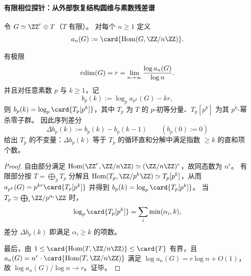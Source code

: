 \paragraph{有限相位探针：从外部恢复结构圆维与素数残差谱}
令 \(G\simeq \ZZ^r\oplus T\)（\(T\) 有限）。
对每个 \(n\ge 1\) 定义
\[
a_n(G):=\card{\operatorname{Hom}(G,\ZZ/n\ZZ)}.
\]

\begin{theorem}\label{thm:cdim-finite-probe-extraction}
有极限
\[
\operatorname{cdim}(G)=r=\lim_{n\to\infty}\frac{\log a_n(G)}{\log n}.
\]
并且对任意素数 \(p\) 与 \(k\ge 1\)，记
\[
b_{p}(k):=\log_p a_{p^k}(G)-kr,
\]
则 \(b_p(k)=\log_p\card{T_p[p^k]}\)，其中 \(T_p\) 为 \(T\) 的 \(p\)-初等分量、\(T_p[p^k]\) 为其 \(p^k\)-幂杀零子群。
因此序列差分
\[
\Delta b_p(k):=b_p(k)-b_p(k-1)\qquad(b_p(0):=0)
\]
给出 \(T_p\) 的不变量：\(\Delta b_p(k)\) 等于 \(T_p\) 的循环直和分解中满足指数 \(\ge k\) 的直和项个数。
\end{theorem}
\begin{proof}
自由部分满足 \(\operatorname{Hom}(\ZZ^r,\ZZ/n\ZZ)\simeq(\ZZ/n\ZZ)^r\)，故同态数为 \(n^r\)。
有限部分按 \(T=\bigoplus_p T_p\) 分解且
\(
\operatorname{Hom}(T_p,\ZZ/p^k\ZZ)\simeq T_p[p^k]
\)，从而
\(
a_{p^k}(G)=p^{kr}\card{T_p[p^k]}
\)
并得到 \(b_p(k)=\log_p\card{T_p[p^k]}\)。
当 \(T_p\simeq\bigoplus_i \ZZ/p^{\alpha_i}\ZZ\) 时，
\[
\log_p\card{T_p[p^k]}=\sum_i \min(\alpha_i,k),
\]
差分 \(\Delta b_p(k)\) 即满足 \(\alpha_i\ge k\) 的项数。
\par
最后，由 \(1\le \card{\operatorname{Hom}(T,\ZZ/n\ZZ)}\le \card{T}\) 有界，且
\(
a_n(G)=n^r\cdot \card{\operatorname{Hom}(T,\ZZ/n\ZZ)}
\)
满足 \(\log a_n(G)=r\log n+O(1)\)，故 \(\log a_n(G)/\log n\to r\)。证毕。
\end{proof}

